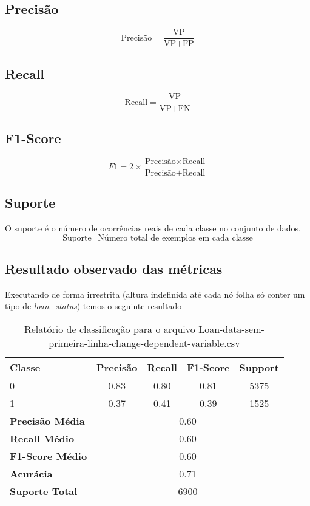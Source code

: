 \documentclass[12pt]{article}
\begin{document}
\subsection*{Precisão}
\[
\text{Precisão} = \frac{\text{VP}}{\text{VP} + \text{FP}}
\]

\subsection*{Recall}
\[
\text{Recall} = \frac{\text{VP}}{\text{VP} + \text{FN}}
\]

\subsection*{F1-Score}
\[
F1 = 2 \times \frac{\text{Precisão} \times \text{Recall}}{\text{Precisão} + \text{Recall}}
\]

\subsection*{Suporte}
O suporte é o número de ocorrências reais de cada classe no conjunto de dados.
\[
\text{Suporte} = \text{Número total de exemplos em cada classe}
\]
\subsection{Resultado observado das métricas}
Executando de forma irrestrita (altura indefinida até cada nó folha só conter um tipo de \textit{loan\_status}) temos o seguinte resultado
\begin{table}[h]
	\centering
	\begin{tabular}{lcccc}
		\hline
		\textbf{Classe} & \textbf{Precisão} & \textbf{Recall} & \textbf{F1-Score} & \textbf{Support} \\ \hline
		0                & 0.83              & 0.80               & 0.81               & 5375              \\
		1                & 0.37              & 0.41               & 0.39               & 1525              \\ \hline
		\textbf{Precisão Média} & \multicolumn{4}{c}{0.60} \\
		\textbf{Recall Médio} & \multicolumn{4}{c}{0.60} \\
		\textbf{F1-Score Médio} & \multicolumn{4}{c}{0.60} \\
		\textbf{Acurácia} & \multicolumn{4}{c}{0.71} \\
		\textbf{Suporte Total} & \multicolumn{4}{c}{6900} \\ \hline
	\end{tabular}
	\caption{Relatório de classificação para o arquivo Loan-data-sem-primeira-linha-change-dependent-variable.csv}
	\label{tab:class_report}
\end{table}
\end{document}
